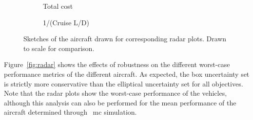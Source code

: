 \begin{figure}
\begin{center}
\begin{subfigure}{0.4\linewidth}
{\begin{tikzpicture}
            \end{tikzpicture}}
            \caption{Total cost}
        \end{subfigure}
        \begin{subfigure}{0.4\linewidth}
            \caption{1/(Cruise L/D)}
        \end{subfigure}
        \caption{Sketches of the aircraft drawn for corresponding radar plots. Drawn to scale for comparison.}
    \end{center}
\end{figure}

Figure~\ref{fig:radar} shows the effects of robustness on
the different worst-case performance metrics of the different aircraft.
As expected, the box uncertainty set is strictly more conservative than the elliptical uncertainty set for
all objectives. Note that the radar plots show the worst-case performance of the vehicles, although
this analysis can also be performed for the mean performance
of the aircraft determined through ~\gls{mc} simulation.

